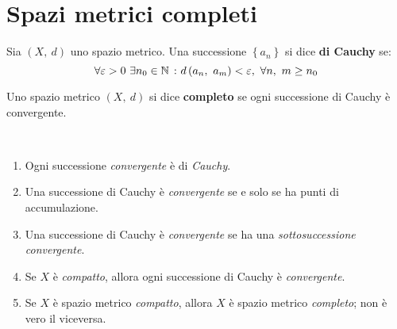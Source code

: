 \section{Spazi metrici completi}
\begin{define}
	Sia $\left(X,\ d\right)$ uno spazio metrico. Una successione $\left\{a_n\right\}$ si dice \textbf{di Cauchy} se:
	\begin{equation}
		\forall \epsilon>0\ \exists n_0\in\naturalset\ \colon \mvf{d}{a_n}{a_m}<\epsilon,\ \forall n,\ m\geq n_0
	\end{equation}
\end{define}
\begin{define}
	Uno spazio metrico $\left(X,\ d\right)$ si dice \textbf{completo} se ogni successione di Cauchy è convergente.
\end{define}
\begin{observe}~{}
	\begin{enumerate}
		\item Ogni successione \textit{convergente} è di \textit{Cauchy}.
		\item Una successione di Cauchy è \textit{convergente} se e solo se ha punti di accumulazione.
		\item Una successione di Cauchy è \textit{convergente} se ha una \textit{sottosuccessione convergente}.
		\item Se $X$ è \textit{compatto}, allora ogni successione di Cauchy è \textit{convergente}.
		\item Se $X$ è spazio metrico \textit{compatto}, allora $X$ è spazio metrico \textit{completo}; non è vero il viceversa.
	\end{enumerate}
\end{observe}
